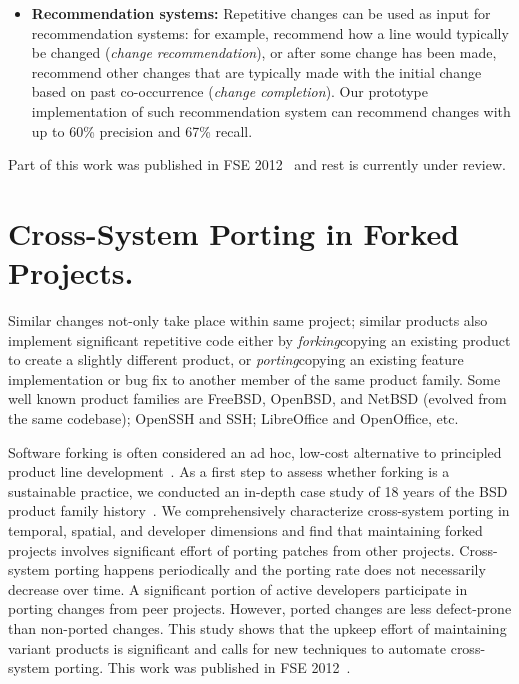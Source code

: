 \documentclass[a4paper, 11pt]{article}
\begin{document}
\begin{small}
\begin{itemize}
\item \textbf{Recommendation systems:} Repetitive changes can be used as input for 
recommendation systems: for example, recommend how a line would typically be changed 
({\em change recommendation}), or after some change has been made, recommend other changes 
that are typically made with the initial change based on past co-occurrence ({\em change completion}).
Our prototype implementation of such recommendation system can recommend changes with up to 60\% precision and 67\% recall.

\end{itemize}

Part of this work was published in FSE 2012~\cite{Ray2012:RCP, Ray2012} and rest is currently under review.


\section*{\small Cross-System Porting in Forked Projects.}

Similar changes not-only take place within same project; similar products also implement significant repetitive code 
either by {\it forking}\textemdash copying an existing product to create a slightly different product, or 
{\it porting}\textemdash copying an existing feature implementation or bug fix to another member of the same product family. 
Some well known product families are FreeBSD, OpenBSD, and NetBSD (evolved from the same codebase);
OpenSSH and SSH; LibreOffice and OpenOffice, etc. 

Software forking is often considered an ad hoc, low-cost alternative to principled product line development~\cite{Raymond1999:CB}.
As a first step to assess whether forking is a sustainable practice, we conducted an in-depth case study of 18 years of the BSD product family 
history~\cite{Ray2012}. We comprehensively characterize cross-system porting in temporal, spatial, and developer dimensions and find that 
maintaining forked projects involves significant effort of porting patches from other projects. Cross-system porting happens periodically 
and the porting rate does not necessarily decrease over time. A significant portion of active developers participate in porting changes from peer projects. However, ported changes are less defect-prone than non-ported changes. This study shows that the upkeep effort of maintaining 
variant products is significant and calls for new techniques to automate cross-system porting. This work was published in FSE 2012~\cite{Ray2012}.


\end{small}
\end{document}
